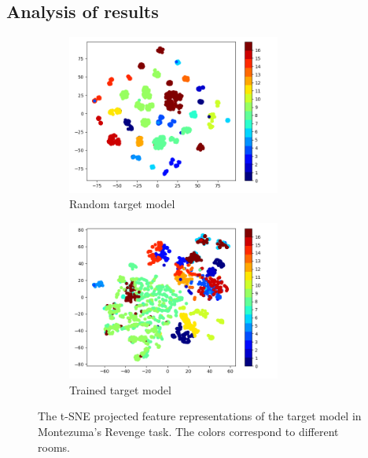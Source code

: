 \documentclass[a4paper,11pt]{elsarticle}
\begin{document}
\subsection{Analysis of results}

\begin{figure}[thb]
  \begin{subfigure}{0.5\textwidth}
    \centering
    \includegraphics[width=7cm]{fig/images/cnd_random.png}
    \caption{Random target model}
    \label{fig:target_features_random}
  \end{subfigure}
  \begin{subfigure}{0.5\textwidth}
    \centering
    \includegraphics[width=7cm]{fig/images/cnd_trained.png}
    \caption{Trained target model}
    \label{fig:trained_features_random}
  \end{subfigure}  
\caption{The t-SNE projected feature representations of the target model in Montezuma's Revenge task. The colors correspond to different rooms.}
\label{fig:cnd_feature_space}
\end{figure}
\end{document}
